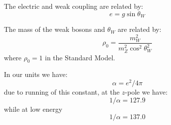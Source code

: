 \documentclass[12pt]{article}
\begin{document}
The electric and weak coupling are related by:
\begin{displaymath}
e = g \sin \theta_W
\end{displaymath}

The mass of the weak bosons and $\theta_W$ are related by:
\begin{displaymath}
 \rho_0 =  \frac{m_W^2}{m_Z^2\cos^2\theta_W^2} 
\end{displaymath}
where $\rho_0 = 1$ in the Standard Model.

In our units we have:
\begin{displaymath}
 \alpha = e^2 / 4 \pi 
\end{displaymath}
due to running of this constant, at the $z$-pole we have:
\begin{displaymath}
1/\alpha = 127.9
\end{displaymath}
while at low energy
\begin{displaymath}
1/\alpha = 137.0
\end{displaymath}
\end{document}
